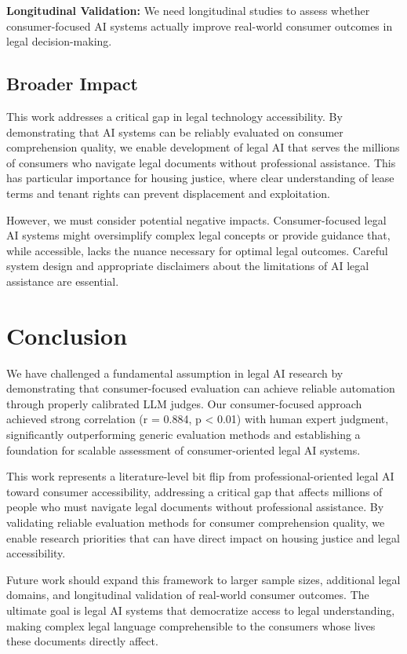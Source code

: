 \documentclass{article}
\begin{document}
\textbf{Longitudinal Validation:} We need longitudinal studies to assess whether consumer-focused AI systems actually improve real-world consumer outcomes in legal decision-making.

\subsection{Broader Impact}

This work addresses a critical gap in legal technology accessibility. By demonstrating that AI systems can be reliably evaluated on consumer comprehension quality, we enable development of legal AI that serves the millions of consumers who navigate legal documents without professional assistance. This has particular importance for housing justice, where clear understanding of lease terms and tenant rights can prevent displacement and exploitation.

However, we must consider potential negative impacts. Consumer-focused legal AI systems might oversimplify complex legal concepts or provide guidance that, while accessible, lacks the nuance necessary for optimal legal outcomes. Careful system design and appropriate disclaimers about the limitations of AI legal assistance are essential.

\section{Conclusion}

We have challenged a fundamental assumption in legal AI research by demonstrating that consumer-focused evaluation can achieve reliable automation through properly calibrated LLM judges. Our consumer-focused approach achieved strong correlation (r = 0.884, p < 0.01) with human expert judgment, significantly outperforming generic evaluation methods and establishing a foundation for scalable assessment of consumer-oriented legal AI systems.

This work represents a literature-level bit flip from professional-oriented legal AI toward consumer accessibility, addressing a critical gap that affects millions of people who must navigate legal documents without professional assistance. By validating reliable evaluation methods for consumer comprehension quality, we enable research priorities that can have direct impact on housing justice and legal accessibility.

Future work should expand this framework to larger sample sizes, additional legal domains, and longitudinal validation of real-world consumer outcomes. The ultimate goal is legal AI systems that democratize access to legal understanding, making complex legal language comprehensible to the consumers whose lives these documents directly affect.
\end{document}
